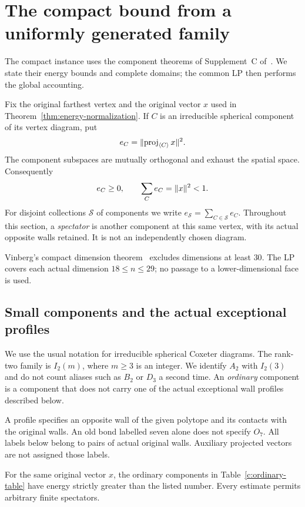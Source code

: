 \section{The compact bound from a uniformly generated family}
\label{c:section}

The compact instance uses the component theorems of Supplement~C
of~\cite{BoundsSupplement}. We state their energy bounds and complete
domains; the common LP then performs the global accounting.

Fix the original farthest vertex and the original vector $x$ used in
Theorem~\ref{thm:energy-normalization}. If $C$ is an irreducible spherical
component of its vertex diagram, put
\[
 e_C=\lVert \operatorname{proj}_{\langle C\rangle}x\rVert^2.
\]
The component subspaces are mutually orthogonal and exhaust the spatial
space. Consequently
\begin{equation}\label{c:budget}
 e_C\ge0,\qquad \sum_C e_C=\lVert x\rVert^2<1.
\end{equation}
For disjoint collections $\mathcal S$ of components we write
$e_{\mathcal S}=\sum_{C\in\mathcal S}e_C$. Throughout this section, a
\emph{spectator} is another component at this same vertex, with its actual
opposite walls retained. It is not an independently chosen diagram.

Vinberg's compact dimension theorem~\cite{Vinberg1984} excludes dimensions
at least $30$. The LP covers each actual dimension $18\le n\le29$;
no passage to a lower-dimensional face is used.

\subsection{Small components and the actual exceptional profiles}
\label{c:small}

We use the usual notation for irreducible spherical Coxeter diagrams.
The rank-two family is $I_2(m)$, where $m\ge3$ is an integer. We identify
$A_2$ with $I_2(3)$ and do not count aliases such as $B_2$ or $D_3$ a
second time. An \emph{ordinary} component is a component that does not
carry one of the actual exceptional wall profiles described below.

A profile specifies an opposite wall of the given polytope and its
contacts with the original walls. An old bond labelled seven alone
does not specify $O_7$. All labels below belong to pairs of actual
original walls. Auxiliary projected vectors are not assigned those labels.

\begin{proposition}
\label{c:ordinary-input}
For the same original vector $x$, the ordinary components in
Table~\ref{c:ordinary-table} have energy strictly greater than the listed
number. Every estimate permits arbitrary finite spectators.
\end{proposition}

